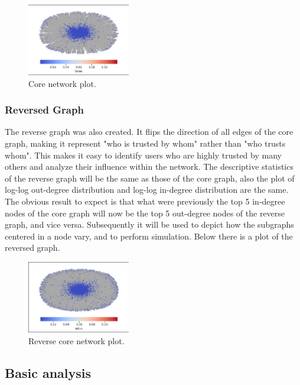 \documentclass[conference]{IEEEtran}
\begin{document}
\begin{figure}[H]
    \centerline{\includegraphics[width=0.4\textwidth]{img/core_network.png}}
    \centering
    \caption{Core network plot.}
    \label{fig:core_network_plot}
\end{figure}

\subsubsection{Reversed Graph}
The reverse graph was also created. It flips the direction of all edges of the core graph, making it represent "who is trusted by whom" rather than "who trusts whom". This makes it easy to identify users who are highly trusted by many others and analyze their influence within the network. The descriptive statistics of the reverse graph will be the same as those of the core graph, also the plot of log-log out-degree distribution and log-log in-degree distribution are the same. The obvious result to expect is that what were previously the top 5 in-degree nodes of the core graph will now be the top 5 out-degree nodes of the reverse graph, and vice versa. Subsequently it will be used to depict how the subgraphs centered in a node vary, and to perform simulation. Below there is a plot of the reversed graph.

\begin{figure}[H]
    \centerline{\includegraphics[width=0.4\textwidth]{img/reversed_core_network.png}}
    \centering
    \caption{Reverse core network plot.}
    \label{fig:reverse_core_network_plot}
\end{figure}

\subsection{Basic analysis}
\end{document}
